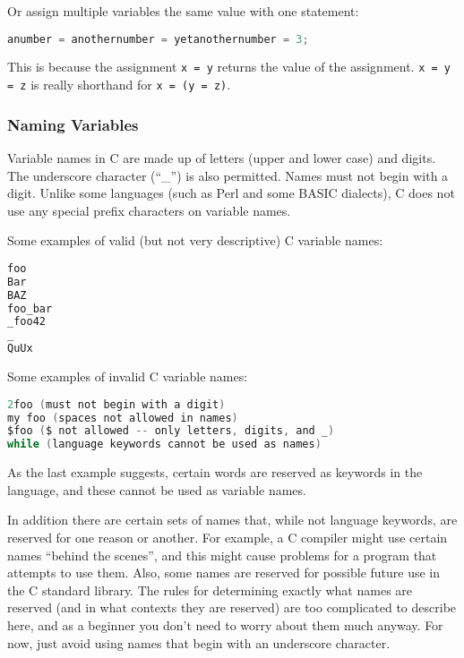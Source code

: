 Or assign multiple variables the same value with one statement:
\lstset{basicstyle=\scriptsize, numbers=left, captionpos=b, tabsize=4}
\begin{lstlisting}[caption=Section \thesection listing \arabic{varcnt},language={C},
breaklines=true,xleftmargin=15pt,label=lst:section\thesection listing\arabic{varcnt}]
anumber = anothernumber = yetanothernumber = 3;
\end{lstlisting}

This is because the assignment \texttt{x = y} returns the value of the
assignment. \texttt{x = y = z} is really shorthand for \texttt{x = (y = z)}.

\subsubsection{Naming Variables}
Variable names in C are made up of letters (upper and lower case) and digits.
The underscore character (``\_'') is also permitted. Names must not begin with
a digit. Unlike some languages (such as Perl and some BASIC dialects), C does
not use any special prefix characters on variable names.

Some examples of valid (but not very descriptive) C variable names:
\lstset{basicstyle=\scriptsize, numbers=left, captionpos=b, tabsize=4}
\begin{lstlisting}[caption=Section \thesection listing \arabic{varcnt},language={C},
breaklines=true,xleftmargin=15pt,label=lst:section\thesection listing\arabic{varcnt}]
foo
Bar
BAZ
foo_bar
_foo42
_
QuUx
\end{lstlisting}

Some examples of invalid C variable names:
\lstset{basicstyle=\scriptsize, numbers=left, captionpos=b, tabsize=4}
\begin{lstlisting}[caption=Section \thesection listing \arabic{varcnt},language={C},
breaklines=true,xleftmargin=15pt,label=lst:section\thesection listing\arabic{varcnt}]
2foo (must not begin with a digit)
my foo (spaces not allowed in names)
$foo ($ not allowed -- only letters, digits, and _)
while (language keywords cannot be used as names)
\end{lstlisting}

As the last example suggests, certain words are reserved as keywords in the
language, and these cannot be used as variable names.

In addition there are certain sets of names that, while not language keywords,
are reserved for one reason or another. For example, a C compiler might use
certain names ``behind the scenes'', and this might cause problems for a
program that attempts to use them. Also, some names are reserved for possible
future use in the C standard library. The rules for determining exactly what
names are reserved (and in what contexts they are reserved) are too complicated
to describe here, and as a beginner you don't need to worry about them much
anyway. For now, just avoid using names that begin with an underscore
character.

